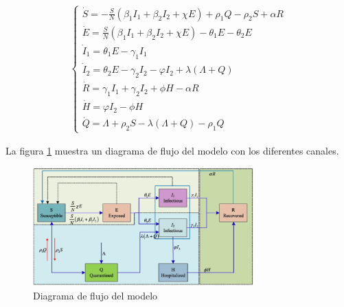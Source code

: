 \documentclass[conference]{IEEEtran}
\begin{document}
\begin{equation}   
    \begin{aligned}
    \left\{
        \begin{array}{l} 
        \dot{S} = - \frac{S}{N}\left( {{\beta _1}{I_1} + {\beta _2}{I_2} + \chi E} \right) + {\rho _1}Q - {\rho _2}S + \alpha R
        \\ 
        \dot{ E} = \frac{S}{N}\left( {{\beta _1}{I_1} + {\beta _2}{I_2} + \chi E} \right) - {\theta _1}E - {\theta _2}E
        \\ 
        {\dot{I}}_1 = {\theta _1}E - {\gamma _1}{I_1}
        \\ 
        \dot{I}_2 = {\theta _2}E - {\gamma _2}{I_2} - \varphi {I_2} + \lambda \left( \varLambda + Q \right) 
        \\ 
        \dot{R} = {\gamma _1}{I_1} + {\gamma _2}{I_2} + \phi H - \alpha R
        \\ 
        \dot{H} = \varphi {I_2} - \phi H
        \\ 
        \dot{Q} = \varLambda + {\rho _2}S - \lambda \left( {\varLambda + Q} \right) - {\rho _1}Q 
    \end{array} 
    \right.
    \end{aligned}
\end{equation}

La figura \ref{block_diagram} muestra un diagrama de flujo del modelo con los diferentes canales.

\begin{figure}[h]
    \centering
    \includegraphics[width=8.5cm]{../Figures/Model_flowchart.png}
    \caption{Diagrama de flujo del modelo}
    \label{block_diagram}
\end{figure}
\end{document}
